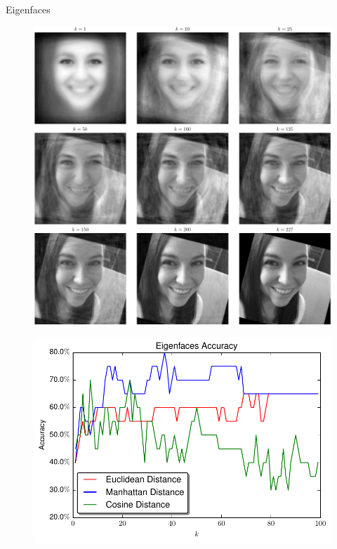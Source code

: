 \documentclass[final]{beamer}
\newlength{\onecolwid}
\begin{document}
\begin{frame}[t]
\begin{columns}[t]
\begin{column}{\onecolwid}
\begin{block}{Eigenfaces}
\begin{figure}
\centering
  \centering
  \includegraphics[width=.85\linewidth]{../data/Face_Reconstruct.pdf}
  \label{fig:face_recon}
\end{figure}

\begin{figure}
\centering
  \centering
  \includegraphics[width=.85\linewidth]{../data/Accuracy.pdf}
  \label{fig:eig_acc}
\end{figure}

\end{block}



\end{column} %




\end{columns}
\end{frame}
\end{document}
